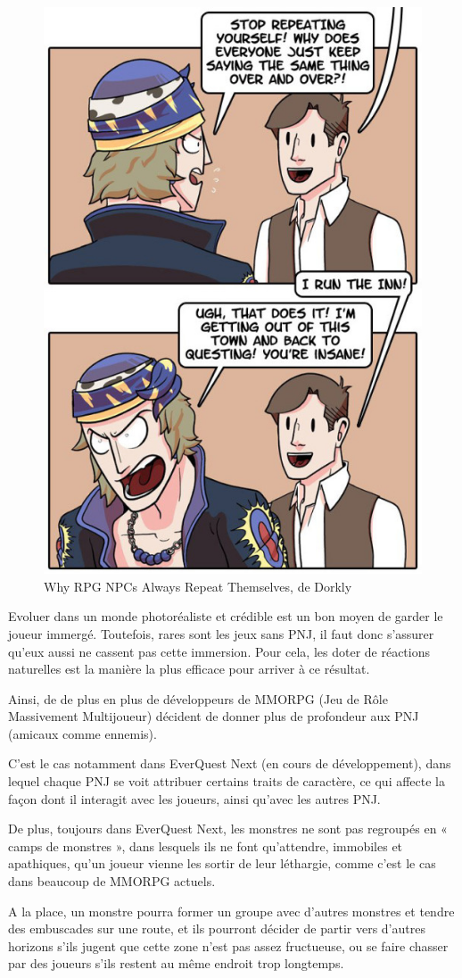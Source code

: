 \documentclass[a4paper, 12pt]{article} %
\begin{document}
\begin{figure}[!h]%
	\begin{center} 
		\includegraphics[width=0.40\columnwidth]{images/repeat3.jpg}%
		\caption{Why RPG NPCs Always Repeat Themselves, de Dorkly}%
	\end{center}
\end{figure}

Evoluer dans un monde photoréaliste et crédible est un bon moyen de garder le joueur immergé. Toutefois, rares sont les jeux sans PNJ, il faut donc s’assurer qu’eux aussi ne cassent pas cette immersion. Pour cela, les doter de réactions naturelles est la manière la plus efficace pour arriver à ce résultat.

Ainsi, de de plus en plus de développeurs de MMORPG (Jeu de Rôle Massivement Multijoueur) décident de donner plus de profondeur aux PNJ (amicaux comme ennemis).

\newpage
C’est le cas notamment dans EverQuest Next (en cours de développement), dans lequel chaque PNJ se voit attribuer certains traits de caractère, ce qui affecte la façon dont il interagit avec les joueurs, ainsi qu’avec les autres PNJ. 

De plus, toujours dans EverQuest Next, les monstres ne sont pas regroupés en « camps de monstres », dans lesquels ils ne font qu’attendre, immobiles et apathiques, qu’un joueur vienne les sortir de leur léthargie, comme c’est le cas dans beaucoup de MMORPG actuels. 

A la place, un monstre pourra former un groupe avec d’autres monstres et tendre des embuscades sur une route, et ils pourront décider de  partir vers d’autres horizons s’ils jugent que cette zone n’est pas assez fructueuse, ou se faire chasser par des joueurs s'ils restent au même endroit trop longtemps.
\end{document}
